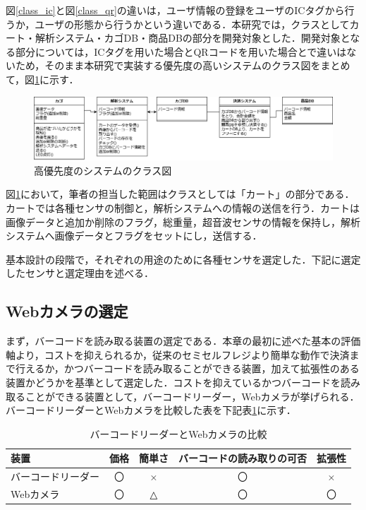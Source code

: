 図\ref{class_ic}と図\ref{class_qr}の違いは，ユーザ情報の登録をユーザのICタグから行うか，ユーザの形態から行うかという違いである．本研究では，クラスとしてカート・解析システム・カゴDB・商品DBの部分を開発対象とした．開発対象となる部分については，ICタグを用いた場合とQRコードを用いた場合とで違いはないため，そのまま本研究で実装する優先度の高いシステムのクラス図をまとめて，図\ref{class_qr_2}に示す．


\begin{figure}[htbp]
\centering
\includegraphics[width=15cm]{./picture/class_final.eps}
\caption{高優先度のシステムのクラス図}
\label{class_qr_2}
\end{figure}


図\ref{class_qr_2}において，筆者の担当した範囲はクラスとしては「カート」の部分である．カートでは各種センサの制御と，解析システムへの情報の送信を行う．カートは画像データと追加か削除のフラグ，総重量，超音波センサの情報を保持し，解析システムへ画像データとフラグをセットにし，送信する．

基本設計の段階で，それぞれの用途のために各種センサを選定した．下記に選定したセンサと選定理由を述べる．


\subsection{Webカメラの選定}


まず，バーコードを読み取る装置の選定である．本章の最初に述べた基本の評価軸より，コストを抑えられるか，従来のセミセルフレジより簡単な動作で決済まで行えるか，かつバーコードを読み取ることができる装置，加えて拡張性のある装置かどうかを基準として選定した．コストを抑えているかつバーコードを読み取ることができる装置として，バーコードリーダー，Webカメラが挙げられる．バーコードリーダーとWebカメラを比較した表を下記表\ref{came}に示す．


\begin{table}[htb]
\begin{center}
\caption{バーコードリーダーとWebカメラの比較}
\begin{tabular}{|l|c|c|c|c|} \hline
装置 & 価格 & 簡単さ &バーコードの読み取りの可否 & 拡張性 \\ \hline \hline
バーコードリーダー & 〇 & × & 〇 & × \\
Webカメラ & 〇 & △ & 〇 &  〇 \\ \hline
\end{tabular}
\label{came}
\end{center}
\end{table}


